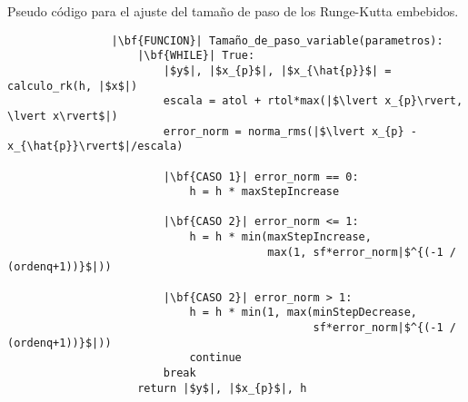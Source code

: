         \begin{longlisting}
            \caption[Pseudo código - Runge-Kutta embebidos]{Pseudo código para el ajuste del tamaño de paso de los Runge-Kutta embebidos.}
            \label{code:stepembebido}				
            \begin{verbatim}
                |\bf{FUNCION}| Tamaño_de_paso_variable(parametros):
                    |\bf{WHILE}| True:
                        |$y$|, |$x_{p}$|, |$x_{\hat{p}}$| = calculo_rk(h, |$x$|)
                        escala = atol + rtol*max(|$\lvert x_{p}\rvert, \lvert x\rvert$|)
                        error_norm = norma_rms(|$\lvert x_{p} - x_{\hat{p}}\rvert$|/escala)
                        
                        |\bf{CASO 1}| error_norm == 0:
                            h = h * maxStepIncrease
                        
                        |\bf{CASO 2}| error_norm <= 1:
                            h = h * min(maxStepIncrease,
                                        max(1, sf*error_norm|$^{(-1 / (ordenq+1))}$|))
                        
                        |\bf{CASO 2}| error_norm > 1:
                            h = h * min(1, max(minStepDecrease, 
                                               sf*error_norm|$^{(-1 / (ordenq+1))}$|))
                            continue
                        break
                    return |$y$|, |$x_{p}$|, h
            \end{verbatim}
        \end{longlisting}

        